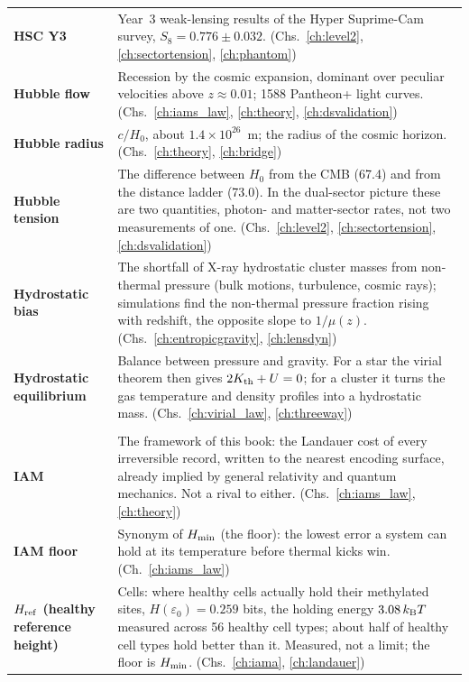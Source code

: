 {\begin{longtable}{@{}>{\raggedright\arraybackslash}p{}>{\raggedright\arraybackslash}p{}@{}}
\textbf{HSC Y3} & Year~3 weak-lensing results of the Hyper Suprime-Cam survey, $S_8=0.776\pm0.032$. {\footnotesize(Chs.~\ref{ch:level2}, \ref{ch:sectortension}, \ref{ch:phantom})}\\[1pt]
\textbf{Hubble flow} & Recession by the cosmic expansion, dominant over peculiar velocities above $z\approx0.01$; 1588 Pantheon+ light curves. {\footnotesize(Chs.~\ref{ch:iams_law}, \ref{ch:theory}, \ref{ch:dsvalidation})}\\[1pt]
\textbf{Hubble radius} & $c/H_0$, about $1.4\times10^{26}$~m; the radius of the cosmic horizon. {\footnotesize(Chs.~\ref{ch:theory}, \ref{ch:bridge})}\\[1pt]
\textbf{Hubble tension} & The difference between $H_0$ from the CMB (67.4) and from the distance ladder (73.0). In the dual-sector picture these are two quantities, photon- and matter-sector rates, not two measurements of one. {\footnotesize(Chs.~\ref{ch:level2}, \ref{ch:sectortension}, \ref{ch:dsvalidation})}\\[1pt]
\textbf{Hydrostatic bias} & The shortfall of X-ray hydrostatic cluster masses from non-thermal pressure (bulk motions, turbulence, cosmic rays); simulations find the non-thermal pressure fraction rising with redshift, the opposite slope to $1/\mu(z)$. {\footnotesize(Chs.~\ref{ch:entropicgravity}, \ref{ch:lensdyn})}\\[1pt]
\textbf{Hydrostatic equilibrium} & Balance between pressure and gravity. For a star the virial theorem then gives $2K_{\rm th}+U=0$; for a cluster it turns the gas temperature and density profiles into a hydrostatic mass. {\footnotesize(Chs.~\ref{ch:virial_law}, \ref{ch:threeway})}\\[1pt]
\multicolumn{2}{@{}l}{\normalsize\textbf{I}}\\[2pt]
\textbf{IAM} & The framework of this book: the Landauer cost of every irreversible record, written to the nearest encoding surface, already implied by general relativity and quantum mechanics. Not a rival to either. {\footnotesize(Chs.~\ref{ch:iams_law}, \ref{ch:theory})}\\[1pt]
\textbf{IAM floor} & Synonym of $H_{\min}$ (the floor): the lowest error a system can hold at its temperature before thermal kicks win. {\footnotesize(Ch.~\ref{ch:iams_law})}\\[1pt]
\textbf{$H_{\rm ref}$ (healthy reference height)} & Cells: where healthy cells actually hold their methylated sites, $H(\varepsilon_0)=0.259$ bits, the holding energy $3.08\,k_{\mathrm B} T$ measured across 56 healthy cell types; about half of healthy cell types hold better than it. Measured, not a limit; the floor is $H_{\min}$. {\footnotesize(Chs.~\ref{ch:iama}, \ref{ch:landauer})}\\[1pt]

\end{longtable}}
